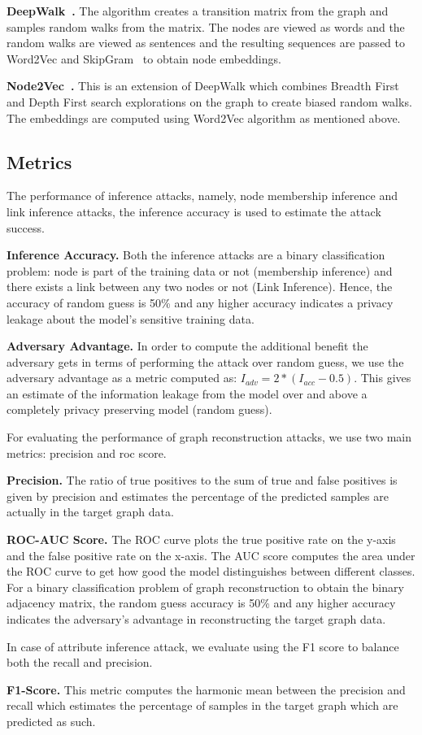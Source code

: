 \noindent\textbf{DeepWalk~\cite{deepwalk}.} The algorithm creates a transition matrix from the graph and samples random walks from the matrix.
The nodes are viewed as words and the random walks are viewed as sentences and the resulting sequences are passed to Word2Vec and SkipGram~\cite{wordemb} to obtain node embeddings.

\noindent\textbf{Node2Vec~\cite{node2vec}.} This is an extension of DeepWalk which combines Breadth First and Depth First search explorations on the graph to create biased random walks.
The embeddings are computed using Word2Vec algorithm as mentioned above.




\subsection{Metrics}

\noindent The performance of inference attacks, namely, node membership inference and link inference attacks, the inference accuracy is used to estimate the attack success.

\noindent\textbf{Inference Accuracy.} Both the inference attacks are a binary classification problem: node is part of the training data or not (membership inference) and there exists a link between any two nodes or not (Link Inference).
Hence, the accuracy of random guess is 50\% and any higher accuracy indicates a privacy leakage about the model's sensitive training data.

\noindent\textbf{Adversary Advantage.} In order to compute the additional benefit the adversary gets in terms of performing the attack over random guess, we use the adversary advantage as a metric computed as: $I_{adv} = 2*(I_{acc}-0.5)$.
This gives an estimate of the information leakage from the model over and above a completely privacy preserving model (random guess).

\noindent For evaluating the performance of graph reconstruction attacks, we use two main metrics: precision and roc score.

\noindent\textbf{Precision.} The ratio of true positives to the sum of true and false positives is given by precision and estimates the percentage of the predicted samples are actually in the target graph data.

\noindent\textbf{ROC-AUC Score.} The ROC curve plots the true positive rate on the y-axis and the false positive rate on the x-axis. The AUC score computes the area under the ROC curve to get how good the model distinguishes between different classes.
For a binary classification problem of graph reconstruction to obtain the binary adjacency matrix, the random guess accuracy is 50\% and any higher accuracy indicates the adversary's advantage in reconstructing the target graph data.

\noindent In case of attribute inference attack, we evaluate using the F1 score to balance both the recall and precision.

\noindent\textbf{F1-Score.} This metric computes the harmonic mean between the precision and recall which estimates the percentage of samples in the target graph which are predicted as such.

